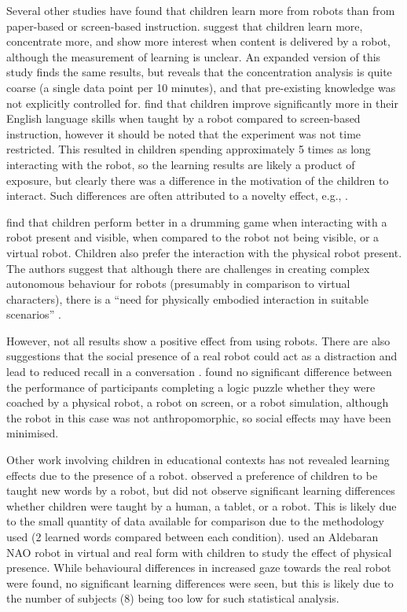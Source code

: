 Several other studies have found that children learn more from robots than from paper-based or screen-based instruction. \cite{han2005educational} suggest that children learn more, concentrate more, and show more interest when content is delivered by a robot, although the measurement of learning is unclear. An expanded version of this study \citep{han2008comparative} finds the same results, but reveals that the concentration analysis is quite coarse (a single data point per 10 minutes), and that pre-existing knowledge was not explicitly controlled for. \cite{hyun2008comparative} find that children improve significantly more in their English language skills when taught by a robot compared to screen-based instruction, however it should be noted that the experiment was not time restricted. This resulted in children spending approximately 5 times as long interacting with the robot, so the learning results are likely a product of exposure, but clearly there was a difference in the motivation of the children to interact. Such differences are often attributed to a novelty effect, e.g., \cite{kanda2004interactive}.

\cite{kose2009effects} find that children perform better in a drumming game when interacting with a robot present and visible, when compared to the robot not being visible, or a virtual robot. Children also prefer the interaction with the physical robot present. The authors suggest that although there are challenges in creating complex autonomous behaviour for robots (presumably in comparison to virtual characters), there is a ``need for physically embodied interaction in suitable scenarios'' \citep{kose2009effects}.

However, not all results show a positive effect from using robots. There are also suggestions that the social presence of a real robot could act as a distraction and lead to reduced recall in a conversation \citep{powers2007comparing}. \cite{wainer2007embodiment} found no significant difference between the performance of participants completing a logic puzzle whether they were coached by a physical robot, a robot on screen, or a robot simulation, although the robot in this case was not anthropomorphic, so social effects may have been minimised.

Other work involving children in educational contexts has not revealed learning effects due to the presence of a robot. \cite{westlund2015comparison} observed a preference of children to be taught new words by a robot, but did not observe significant learning differences whether children were taught by a human, a tablet, or a robot. This is likely due to the small quantity of data available for comparison due to the methodology used (2 learned words compared between each condition). \cite{looije2012help} used an Aldebaran NAO robot in virtual and real form with children to study the effect of physical presence. While behavioural differences in increased gaze towards the real robot were found, no significant learning differences were seen, but this is likely due to the number of subjects (8) being too low for such statistical analysis.

